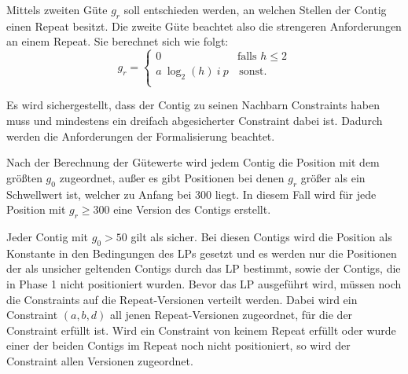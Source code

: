 
Mittels zweiten Güte $g_r$ soll entschieden werden, an welchen Stellen der Contig einen Repeat besitzt. Die zweite Güte beachtet also die strengeren Anforderungen an einem Repeat. 
Sie berechnet sich wie folgt:
\[ g_r = \left\{
\begin{array}{ll}
0 & \textrm{falls } h \leq 2 \\
a\ \log_2(h) \ i \  p & \, \textrm{sonst.} \\
\end{array}
\right. \]

Es wird sichergestellt, dass der Contig zu seinen Nachbarn Constraints haben muss und mindestens ein dreifach abgesicherter Constraint dabei ist. 
Dadurch werden die Anforderungen der Formalisierung beachtet.

Nach der Berechnung der Gütewerte wird jedem Contig die Position mit dem größten $g_0$ zugeordnet, außer es gibt Positionen bei denen $g_r$ größer als ein Schwellwert ist, welcher zu Anfang bei 300 liegt. In diesem Fall wird für jede Position mit $g_r \geq 300$ eine Version des Contigs erstellt.

Jeder Contig mit $g_0 > 50$ gilt als sicher. Bei diesen Contigs wird die Position als Konstante in den Bedingungen des LPs gesetzt und es werden nur die Positionen der als unsicher geltenden Contigs durch das LP bestimmt, sowie der Contigs, die in Phase 1 nicht positioniert wurden. Bevor das LP ausgeführt wird, müssen noch die Constraints auf die Repeat-Versionen verteilt werden. 
Dabei wird ein Constraint $(a,b,d)$ all jenen Repeat-Versionen zugeordnet, für die der Constraint erfüllt ist. Wird ein Constraint von keinem Repeat erfüllt oder wurde einer der beiden Contigs im Repeat noch nicht positioniert, so wird der Constraint allen Versionen zugeordnet.

